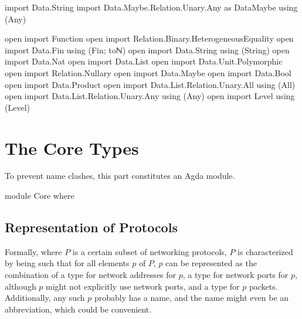 \documentclass{report}
\begin{document}
\begin{code}
import Data.String
import Data.Maybe.Relation.Unary.Any as DataMaybe using (Any)

open import Function
open import Relation.Binary.HeterogeneousEquality
open import Data.Fin using (Fin; toℕ)
open import Data.String using (String)
open import Data.Nat
open import Data.List
open import Data.Unit.Polymorphic
open import Relation.Nullary
open import Data.Maybe
open import Data.Bool
open import Data.Product
open import Data.List.Relation.Unary.All using (All)
open import Data.List.Relation.Unary.Any using (Any)
open import Level using (Level)
\end{code}

\part{The Core Types}
To prevent name clashes, this part constitutes an Agda module.

\begin{code}
module Core where
\end{code}

\chapter{Representation of Protocols}
Formally, where \(P\) is a certain subset of networking protocols, \(P\) is characterized by being such that for all elements \(p\) of \(P\), \(p\) can be represented as the combination of a type for network addresses for \(p\), a type for network ports for \(p\), although \(p\) might not explicitly use network ports, and a type for \(p\) packets.  Additionally, any such \(p\) probably has a name, and the name might even be an abbreviation, which could be convenient.
\end{document}
